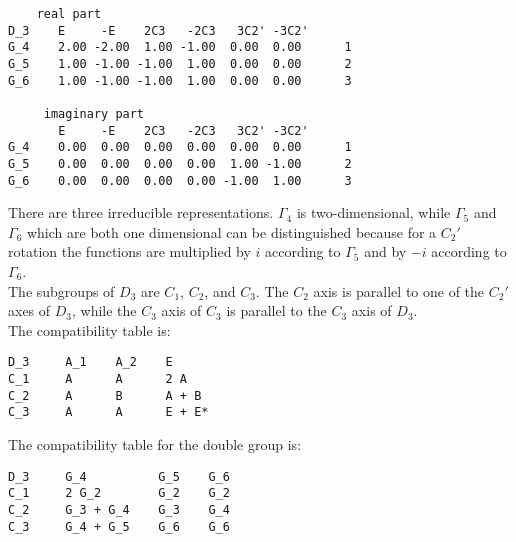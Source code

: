 \documentclass[12pt,a4paper,twoside]{report}
\begin{document}
\begin{tcolorbox}
\begin{footnotesize}
\begin{verbatim}
    real part
D_3    E     -E    2C3   -2C3   3C2' -3C2'
G_4    2.00 -2.00  1.00 -1.00  0.00  0.00      1
G_5    1.00 -1.00 -1.00  1.00  0.00  0.00      2
G_6    1.00 -1.00 -1.00  1.00  0.00  0.00      3

     imaginary part
       E     -E    2C3   -2C3   3C2' -3C2'
G_4    0.00  0.00  0.00  0.00  0.00  0.00      1
G_5    0.00  0.00  0.00  0.00  1.00 -1.00      2
G_6    0.00  0.00  0.00  0.00 -1.00  1.00      3
\end{verbatim}
\end{footnotesize}
\end{tcolorbox}

There are three irreducible representations. $\Gamma_4$ is two-dimensional,
while $\Gamma_5$ and $\Gamma_6$ which are both one dimensional can be distinguished
because for a $C_2'$ rotation the functions are multiplied by $i$ according to
$\Gamma_5$ and by $-i$ according to $\Gamma_6$. \\
The subgroups of $D_3$ are $C_1$, $C_2$, and $C_3$. The $C_2$ axis is 
parallel to one of the $C_2'$ axes of $D_3$, while the $C_3$ axis 
of $C_3$ is parallel to the $C_3$ axis of $D_3$. \\
The compatibility table is:

\begin{tcolorbox}
\begin{footnotesize}
\begin{verbatim}
D_3     A_1    A_2    E    
C_1     A      A      2 A      
C_2     A      B      A + B        
C_3     A      A      E + E*      
\end{verbatim}
\end{footnotesize}
\end{tcolorbox}

The compatibility table for the double group is:

\begin{tcolorbox}
\begin{footnotesize}
\begin{verbatim}
D_3     G_4          G_5    G_6    
C_1     2 G_2        G_2    G_2
C_2     G_3 + G_4    G_3    G_4
C_3     G_4 + G_5    G_6    G_6   
\end{verbatim}
\end{footnotesize}
\end{tcolorbox}
\end{document}
